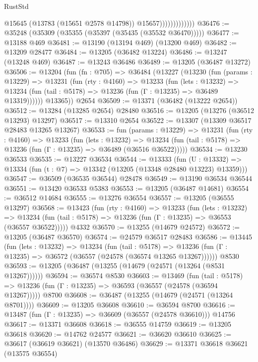 \begin{lexlean}{RustStd}
\begin{coremodule}
                              @15645
                              (@13783 (@15651 @2578 @14798))
                              @15657)))))))))))))
@36476 := @35248 (@35309 (@35355 (@35397 (@35435 (@35532 @36470)))))
@36477 := @13188 @469
@36481 := @13190 (@13194 @469) (@13200 @469)
@36482 := @13209 @28477
@36484 := @13205 (@36482 @13224)
@36486 := @13247 (@13248 @469)
@36487 := @13243 @36486
@36489 := @13205 (@36487 @13272)
@36506 := @13204
    (fun (fn : @705) =>
    @36484
      (@13227
        (@13230
          (fun (params : @13229) =>
          @13231
            (fun (rty : @4160) =>
            @13233
              (fun (lets : @13232) =>
              @13234 (fun (tail : @5178) => @13236 (fun (Γ : @13235) => @36489 @13319))))))
        @13365))
    @2654
@36509 := @13371 (@36482 (@13222 @2654))
@36512 := @13284 (@13285 @2654) @28480
@36516 := @13205 (@13276 (@36512 @13293) @13297)
@36517 := @13310 @2654
@36522 := @13307 (@13309 @36517 @28483 @13265 @13267)
@36533 := fun (params : @13229) =>
  @13231
    (fun (rty : @4160) =>
    @13233
      (fun (lets : @13232) =>
      @13234 (fun (tail : @5178) => @13236 (fun (Γ : @13235) => @36489 (@36516 @36522)))))
@36534 := @13230 @36533
@36535 := @13227 @36534
@36544 := @13333
    (fun (U : @13332) => @13334 (fun (t : @7) => @13342 (@13205 (@13348 @28480 @13223) @13359)))
@36547 := @36509 (@36535 @36544) @28478
@36549 := @13190 @36534 @36544
@36551 := @13420 @36533 @5383
@36553 := @13205 (@36487 @14681)
@36554 := @36512 @14684
@36555 := @13276 @36554
@36557 := @13205 (@36555 @13297)
@36568 := @13423
    (fun (rty : @4160) =>
    @13233
      (fun (lets : @13232) =>
      @13234 (fun (tail : @5178) => @13236 (fun (Γ : @13235) => @36553 (@36557 @36522)))))
    @4332
@36570 := @13255 (@14679 @24572)
@36572 := @13205 (@36487 @36570)
@36574 := @24579 @36517 @28483
@36586 := @13445
    (fun (lets : @13232) =>
    @13234
      (fun (tail : @5178) =>
      @13236 (fun (Γ : @13235) => @36572 (@36557 (@24578 (@36574 @13265 @13267))))))
    @8530
@36593 := @13205 (@36487 (@13255 (@14679 (@24571 (@13264 (@8531 @13267))))))
@36594 := @36574 @8530
@36603 := @13469
    (fun (tail : @5178) => @13236 (fun (Γ : @13235) => @36593 (@36557 (@24578 (@36594 @13267)))))
    @8700
@36608 := @36487 (@13255 (@14679 (@24571 (@13264 @8701))))
@36609 := @13205 @36608
@36610 := @36594 @8700
@36616 := @13487 (fun (Γ : @13235) => @36609 (@36557 (@24578 @36610))) @14756
@36617 := @13371 @36608
@36618 := @36555 @14759
@36619 := @13205 @36618
@36620 := @14762 @24577
@36621 := @36620 @36610
@36625 := @36617 (@36619 @36621) (@13570 @36486)
@36629 := @13371 @36618 @36621 (@13575 @36554)

\end{coremodule}
\end{lexlean}

